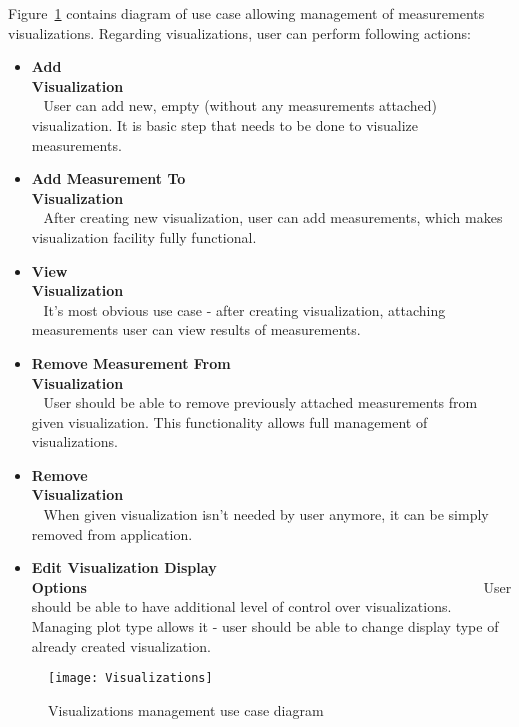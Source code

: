Figure~\ref{fig:usecases_visualisations} contains diagram of use case allowing management of measurements
visualizations. Regarding visualizations, user can perform following actions:


\begin{itemize}
 \item {\bf Add Visualization}~~~~~~~~~~~~~~~~~~~~~~~~~~~~~~~~~~~~~~~~~~~~~~~~~~~~~~~~\linebreak
User can add new, empty (without any measurements attached) visualization. It is basic step that needs to be done to
visualize measurements.
 \item {\bf Add Measurement To Visualization}~~~~~~~~~~~~~~~~~~~~~~~~~~~~~~~~~~~~~~~~~~~~~~~~~~~~~~~~\linebreak
After creating new visualization, user can add measurements, which makes visualization facility fully functional.
 \item {\bf View Visualization}~~~~~~~~~~~~~~~~~~~~~~~~~~~~~~~~~~~~~~~~~~~~~~~~~~~~~~~~\linebreak
It's most obvious use case - after creating visualization, attaching measurements user can view results of measurements.
 \item {\bf Remove Measurement From Visualization}~~~~~~~~~~~~~~~~~~~~~~~~~~~~~~~~~~~~~~~~~~~~~~~~~~~~~~~~\linebreak
User should be able to remove previously attached measurements from given visualization. This functionality allows full
management of visualizations.~~~~~~~~~~~~~~~~~~~~~~~~~~~~~~~~~~~~~~~~~~~~~~~~~~~~~~~~\linebreak
 \item {\bf Remove Visualization}~~~~~~~~~~~~~~~~~~~~~~~~~~~~~~~~~~~~~~~~~~~~~~~~~~~~~~~~\linebreak
When given visualization isn't needed by user anymore, it can be simply removed from application.
 \item {\bf Edit Visualization Display Options}~~~~~~~~~~~~~~~~~~~~~~~~~~~~~~~~~~~~~~~~~~~~~~~~~~~~~~~~\linebreak
User should be able to have additional level of control over visualizations. Managing plot type allows it - user should
be able to change display type of already created visualization.

\end{itemize}



\begin{figure}[ht]
   \centering
   \texttt{[image: Visualizations]}
   \caption{Visualizations management use case diagram}
   \label{fig:usecases_visualisations}
\end{figure}